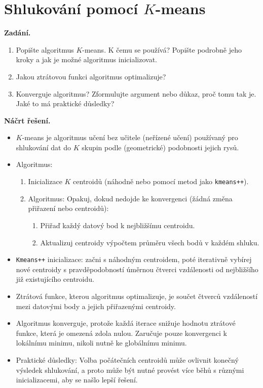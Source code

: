 \section{Shlukování pomocí $K$-means}

\noindent\textbf{Zadání.}\par
\begin{enumerate}
  \item Popište algoritmus $K$-means. K čemu se používá? Popište podrobně jeho kroky a jak je možné algoritmus inicializovat.
  \item Jakou ztrátovou funkci algoritmus optimalizuje?
  \item Konverguje algoritmus? Zformulujte argument nebo důkaz, proč tomu tak je. Jaké to má praktické důsledky?
\end{enumerate}

\medskip
\noindent\textbf{Náčrt řešení.}\par
\begin{itemize}
  \item $K$-means je algoritmus učení bez učitele (neřízené učení) používaný pro shlukování dat do $K$ skupin podle (geometrické)
    podobnosti jejich rysů.
  \item Algoritmus:
    \begin{enumerate}
      \item Inicializace $K$ centroidů (náhodně nebo pomocí metod jako \texttt{kmeans++}).
      \item Algoritmus: Opakuj, dokud nedojde ke konvergenci (žádná změna přiřazení nebo centroidů):
        \begin{enumerate}
          \item Přiřaď každý datový bod k nejbližšímu centroidu.
          \item Aktualizuj centroidy výpočtem průměru všech bodů v každém shluku.
        \end{enumerate}
    \end{enumerate}
  \item \texttt{Kmeans++} inicializace: začni s náhodným centroidem, poté iterativně vybírej nové centroidy s pravděpodobností úměr\-nou
    čtverci vzdálenosti od nejbližšího již existujícího centroidu.
  \item Ztrátová funkce, kterou algoritmus optimalizuje, je součet čtverců vzdáleností mezi datovými body a jejich přiřazenými
    centroidy.
  \item Algoritmus konverguje, protože každá iterace snižuje hodnotu ztrátové funkce, která je omezená zdola nulou. Zaručuje
    pouze konvergenci k lokálnímu minimu, nikoli nutně ke globálnímu minimu.
  \item Praktické důsledky: Volba počátečních centroidů může ovlivnit konečný výsledek shlukování, a proto může být nutné
    provést více běhů s různými inicializacemi, aby se našlo lepší řešení.
\end{itemize}


